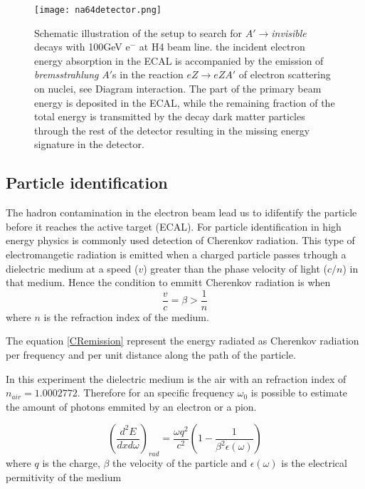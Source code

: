 \begin{figure}[ht]
		\hspace*{\fill}
		\centering
		\texttt{[image: na64detector.png]}
		\caption{Schematic illustration of the setup to search for $A'\rightarrow${\it invisible} decays with 100GeV e$^-$
		at H4 beam line. the incident electron energy absorption in the ECAL is accompanied by the emission of
		{\it bremsstrahlung} $A'$s in the reaction $eZ\rightarrow eZA'$ of electron scattering on nuclei, see Diagram
		interaction. The part of the primary beam energy is deposited in the ECAL, while the remaining fraction of the total
		energy is transmitted by the decay dark matter particles through the rest of the detector resulting in the missing
		energy signature in the detector.}\label{fig:na64detector}
\end{figure}

\subsection{Particle identification}

The hadron contamination in the electron beam lead us to idifentify the particle before it reaches the active target
(ECAL). For particle identification in high energy physics is commonly used detection of Cherenkov radiation. This type
of electromangetic radiation is emitted when a charged particle passes trhough a dielectric medium at a speed ($v$) greater
than the phase velocity of light ($c/n$) in that medium. Hence the condition to emmitt Cherenkov radiation is when
\begin{equation}\label{condCR}
\frac{v}{c} = \beta > \frac{1}{n} 
\end{equation}
where $n$ is the refraction index of the medium. 

The equation \ref{CRemission} represent the energy radiated as Cherenkov radiation per frequency and per unit distance along the path of
the particle. \par
In this experiment the dielectric medium is the air with an refraction index of $n_{air}=1.0002772$. Therefore for an
specific frequency $\omega_0$ is possible to estimate the amount of photons emmited by an electron or a pion. 

\begin{equation}\label{CRemission}
\left(\frac{d^2E}{dxd\omega}\right)_{rad} = \frac{\omega q^2}{c^2}
\left(1-\frac{1}{\beta^2\epsilon(\omega)}\right) 
\end{equation}
where $q$ is the charge, $\beta$ the velocity of the particle and $\epsilon(\omega)$ is the electrical permitivity of the medium 


